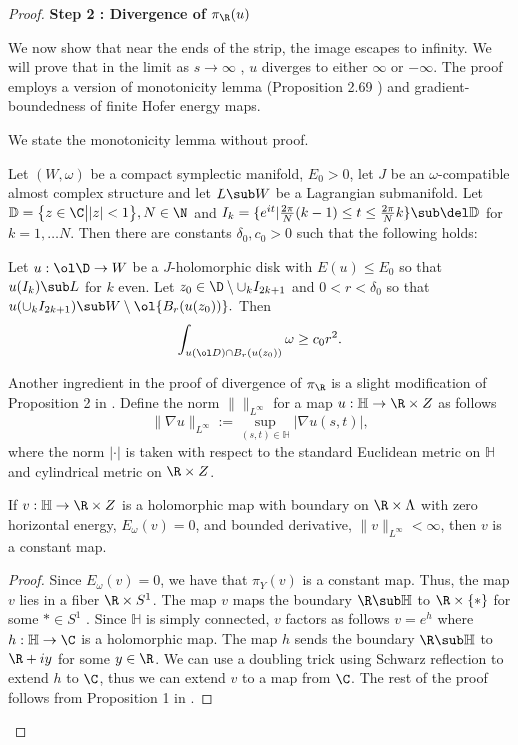 \begin{proof}
\textbf{Step 2 : Divergence of $\pi_\R (u)$}

We now show that near the ends of the strip, the image escapes to infinity.  We will prove that in the limit as $s \to \infty$ ,  $u$ diverges to either $\infty$ or $-\infty$. The proof employs a version of monotonicity lemma (Proposition 2.69 \cite{Abbasbook}) and gradient-boundedness of finite Hofer energy maps. 

We state the monotonicity lemma without proof.
\begin{lemma}\label{lemm:gromMon}
    Let $(W,\omega)$ be a compact symplectic manifold, $E_0 >0$, let $J$ be an $\omega$-compatible almost complex structure and let $L \sub W$ be a Lagrangian submanifold. Let $\mathbb D = \big\{ z \in \C \big| |z| < 1 \big\}, N \in \N $ and $I_k = \{ e^{it} | \frac{2\pi}{N}(k-1) \leq t \leq \frac{2\pi}{N}k \} \sub \del \mathbb D $ for $k= 1,\dots N.$ Then there are constants $\delta_0,c_0 > 0 $ such that the following holds: 
    
    Let $u:\ol \D \to W$ be a $J$-holomorphic disk with $E(u)\leq E_0 $ so that $u(I_k)\sub L$ for $k$ even. Let $z_0 \in \D \setminus \cup_{k} I_{2k+1}$ and $0< r < \delta_0$ so that $u(\cup_k I_{2k+1}) \sub W\setminus \ol{B_r(u(z_0))}.$ Then $$\int_{u(\ol D) \cap B_r(u(z_0))} \omega \geq c_0 r^2.$$
\end{lemma}

Another ingredient in the proof of divergence of $\pi_\R$ is a slight modification of Proposition 2 in \cite{erkaoAsymp}.  Define the norm $\| \|_{L^\infty}$ for a map $u:\mathbb H \to \R\times Z$ as follows $$\| \nabla u \|_{L^\infty} := \sup_{(s,t)\in \mathbb H} | \nabla u (s,t)|,$$ where the norm $|\cdot| $ is taken with respect to the standard Euclidean metric on $\mathbb H$ and cylindrical metric on $\R \times Z$. 

\begin{lemma}\label{lemm:prop1erk}
    If $v: \mathbb H \to \R \times Z$  is a holomorphic map with boundary on $\R \times \Lambda$ with zero horizontal energy, $E_\omega (v) = 0$, and bounded derivative, $\| v\|_{L^{\infty}} < \infty$, then $v$ is a constant map.
\end{lemma}

\begin{proof}
    Since $E_\omega(v)=0$, we have that $\pi_Y (v)$ is a constant map. Thus, the map $v$ lies in a fiber $\R \times S^1$. The map $v$ maps the boundary $\R \sub \mathbb H$ to $\R \times \{ * \}$ for some $* \in S^1$ . Since $\mathbb H$ is simply connected, $v$ factors as follows $v = e^{h}$ where $h: \mathbb H \to \C$ is a holomorphic map. The map $h$ sends the boundary $\R \sub \mathbb H $ to $\R + iy$ for some $y\in \R$.  We can use a doubling trick using Schwarz reflection to extend $h$ to $\C$, thus we can extend $v$ to a map from $\C$. The rest of the proof follows from Proposition 1 in \cite{erkaoAsymp}.
\end{proof}



\end{proof}
